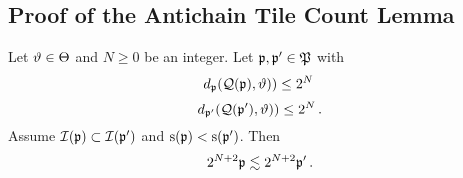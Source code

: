 \subsection{Proof of the Antichain Tile Count Lemma}
\label{subsec-geolem}


\begin{lemma}\label{tile-reach}
\leanok
{}
Let ${\vartheta}\in {\Theta}$ and $N\ge0$ be an integer.
Let ${\mathfrak p}, {\mathfrak p}'\in {\mathfrak P}$ with
\begin{equation}\label{eqassumedismfa}
    d_{{\mathfrak p}}({\mathcal{Q}}({\mathfrak p}), {\vartheta}))\le 2^N\,
\end{equation}
\begin{equation}\label{eqassumedismfap}
    d_{{\mathfrak p}'}({\mathcal{Q}}({\mathfrak p}'), {\vartheta}))\le 2^N\, .
\end{equation}
Assume ${\mathcal{I}}({\mathfrak p})\subset {\mathcal{I}}({\mathfrak p}')$ and ${\mathrm{s}}({\mathfrak p})<{\mathrm{s}}({\mathfrak p}')$.
Then
\begin{equation}\label{lp'lp''}2^{N+2}{\mathfrak p}\lesssim 2^{N+2} {\mathfrak p}'\, .
\end{equation}
\end{lemma}

